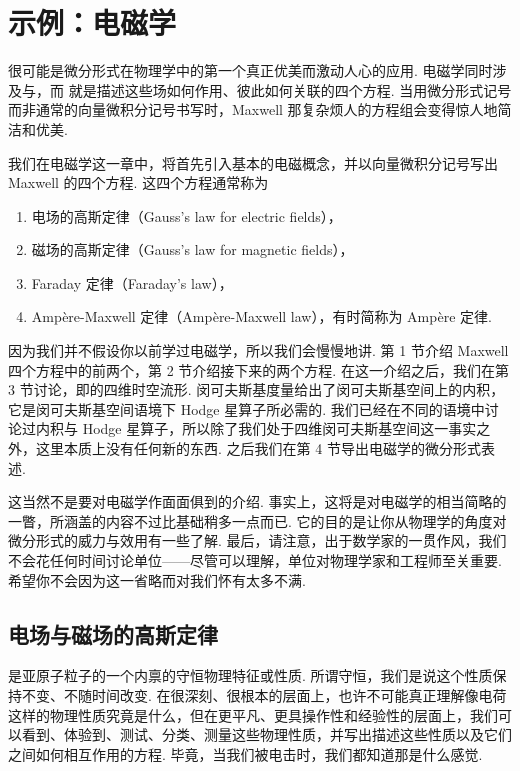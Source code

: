 \chapter{示例：电磁学}

很可能是微分形式在物理学中的第一个真正优美而激动人心的应用. 电磁学同时涉及与，而 就是描述这些场如何作用、彼此如何关联的四个方程. 当用微分形式记号而非通常的向量微积分记号书写时，Maxwell 那复杂烦人的方程组会变得惊人地简洁和优美.

我们在电磁学这一章中，将首先引入基本的电磁概念，并以向量微积分记号写出 Maxwell 的四个方程. 这四个方程通常称为
\begin{enumerate}
  \item 电场的高斯定律（Gauss's law for electric fields），
  \item 磁场的高斯定律（Gauss's law for magnetic fields），
  \item Faraday 定律（Faraday's law），
  \item Ampère-Maxwell 定律（Ampère-Maxwell law），有时简称为 Ampère 定律.
\end{enumerate}
因为我们并不假设你以前学过电磁学，所以我们会慢慢地讲. 第 1 节介绍 Maxwell 四个方程中的前两个，第 2 节介绍接下来的两个方程. 在这一介绍之后，我们在第 3 节讨论，即的四维时空流形. 闵可夫斯基度量给出了闵可夫斯基空间上的内积，它是闵可夫斯基空间语境下 Hodge 星算子所必需的. 我们已经在不同的语境中讨论过内积与 Hodge 星算子，所以除了我们处于四维闵可夫斯基空间这一事实之外，这里本质上没有任何新的东西. 之后我们在第 4 节导出电磁学的微分形式表述.

这当然不是要对电磁学作面面俱到的介绍. 事实上，这将是对电磁学的相当简略的一瞥，所涵盖的内容不过比基础稍多一点而已. 它的目的是让你从物理学的角度对微分形式的威力与效用有一些了解. 最后，请注意，出于数学家的一贯作风，我们不会花任何时间讨论单位——尽管可以理解，单位对物理学家和工程师至关重要. 希望你不会因为这一省略而对我们怀有太多不满.

\section{电场与磁场的高斯定律}

是亚原子粒子的一个内禀的守恒物理特征或性质. 所谓守恒，我们是说这个性质保持不变、不随时间改变. 在很深刻、很根本的层面上，也许不可能真正理解像电荷这样的物理性质究竟是什么，但在更平凡、更具操作性和经验性的层面上，我们可以看到、体验到、测试、分类、测量这些物理性质，并写出描述这些性质以及它们之间如何相互作用的方程. 毕竟，当我们被电击时，我们都知道那是什么感觉.

